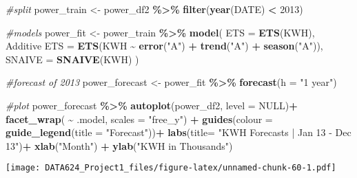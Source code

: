 \documentclass[
]{article}
\newenvironment{Shaded}{\begin{snugshade}}{\end{snugshade}}
\newcommand{\AttributeTok}[1]{\textcolor[rgb]{0.13,0.29,0.53}{#1}}
\newcommand{\CommentTok}[1]{\textcolor[rgb]{0.56,0.35,0.01}{\textit{#1}}}
\newcommand{\ConstantTok}[1]{\textcolor[rgb]{0.56,0.35,0.01}{#1}}
\newcommand{\DecValTok}[1]{\textcolor[rgb]{0.00,0.00,0.81}{#1}}
\newcommand{\FunctionTok}[1]{\textcolor[rgb]{0.13,0.29,0.53}{\textbf{#1}}}
\newcommand{\NormalTok}[1]{#1}
\newcommand{\OtherTok}[1]{\textcolor[rgb]{0.56,0.35,0.01}{#1}}
\newcommand{\SpecialCharTok}[1]{\textcolor[rgb]{0.81,0.36,0.00}{\textbf{#1}}}
\newcommand{\StringTok}[1]{\textcolor[rgb]{0.31,0.60,0.02}{#1}}
\begin{document}
\begin{Shaded}
\begin{Highlighting}[]
\CommentTok{\#split}
\NormalTok{power\_train }\OtherTok{\textless{}{-}}\NormalTok{ power\_df2 }\SpecialCharTok{\%\textgreater{}\%} 
  \FunctionTok{filter}\NormalTok{(}\FunctionTok{year}\NormalTok{(DATE) }\SpecialCharTok{\textless{}} \DecValTok{2013}\NormalTok{)}

\CommentTok{\#models}
\NormalTok{power\_fit }\OtherTok{\textless{}{-}}\NormalTok{ power\_train }\SpecialCharTok{\%\textgreater{}\%} 
    \FunctionTok{model}\NormalTok{(}
    \AttributeTok{ETS =} \FunctionTok{ETS}\NormalTok{(KWH),}
    \StringTok{\textasciigrave{}}\AttributeTok{Additive ETS}\StringTok{\textasciigrave{}} \OtherTok{=} \FunctionTok{ETS}\NormalTok{(KWH }\SpecialCharTok{\textasciitilde{}} \FunctionTok{error}\NormalTok{(}\StringTok{"A"}\NormalTok{) }\SpecialCharTok{+} \FunctionTok{trend}\NormalTok{(}\StringTok{"A"}\NormalTok{) }\SpecialCharTok{+} \FunctionTok{season}\NormalTok{(}\StringTok{"A"}\NormalTok{)),}
    \AttributeTok{SNAIVE =} \FunctionTok{SNAIVE}\NormalTok{(KWH)}
\NormalTok{  )}

\CommentTok{\#forecast of 2013}
\NormalTok{power\_forecast }\OtherTok{\textless{}{-}}\NormalTok{ power\_fit }\SpecialCharTok{\%\textgreater{}\%} 
  \FunctionTok{forecast}\NormalTok{(}\AttributeTok{h =} \StringTok{"1 year"}\NormalTok{)}

\CommentTok{\#plot}
\NormalTok{power\_forecast }\SpecialCharTok{\%\textgreater{}\%}
  \FunctionTok{autoplot}\NormalTok{(power\_df2, }\AttributeTok{level =} \ConstantTok{NULL}\NormalTok{)}\SpecialCharTok{+}
  \FunctionTok{facet\_wrap}\NormalTok{( }\SpecialCharTok{\textasciitilde{}}\NormalTok{ .model, }\AttributeTok{scales =} \StringTok{"free\_y"}\NormalTok{) }\SpecialCharTok{+}
  \FunctionTok{guides}\NormalTok{(}\AttributeTok{colour =} \FunctionTok{guide\_legend}\NormalTok{(}\AttributeTok{title =} \StringTok{"Forecast"}\NormalTok{))}\SpecialCharTok{+}
  \FunctionTok{labs}\NormalTok{(}\AttributeTok{title=} \StringTok{"KWH Forecasts | Jan \textquotesingle{}13 {-} Dec \textquotesingle{}13"}\NormalTok{)}\SpecialCharTok{+}
  \FunctionTok{xlab}\NormalTok{(}\StringTok{"Month"}\NormalTok{) }\SpecialCharTok{+}
  \FunctionTok{ylab}\NormalTok{(}\StringTok{"KWH in Thousands"}\NormalTok{) }
\end{Highlighting}
\end{Shaded}

\texttt{[image: DATA624\_Project1\_files/figure-latex/unnamed-chunk-60-1.pdf]}
\end{document}
